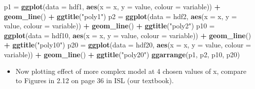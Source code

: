 \documentclass[]{article}
\newenvironment{Shaded}{\begin{snugshade}}{\end{snugshade}}
\newcommand{\DataTypeTok}[1]{\textcolor[rgb]{0.13,0.29,0.53}{#1}}
\newcommand{\KeywordTok}[1]{\textcolor[rgb]{0.13,0.29,0.53}{\textbf{#1}}}
\newcommand{\NormalTok}[1]{#1}
\newcommand{\OperatorTok}[1]{\textcolor[rgb]{0.81,0.36,0.00}{\textbf{#1}}}
\newcommand{\StringTok}[1]{\textcolor[rgb]{0.31,0.60,0.02}{#1}}
\providecommand{\tightlist}{%
  \setlength{\itemsep}{0pt}\setlength{\parskip}{0pt}}
\begin{document}
\begin{Shaded}
\begin{Highlighting}[]
\NormalTok{p1 =}\StringTok{ }\KeywordTok{ggplot}\NormalTok{(}\DataTypeTok{data =}\NormalTok{ hdf1, }\KeywordTok{aes}\NormalTok{(}\DataTypeTok{x =}\NormalTok{ x, }\DataTypeTok{y =}\NormalTok{ value, }\DataTypeTok{colour =}\NormalTok{ variable)) }\OperatorTok{+}\StringTok{ }
\StringTok{    }\KeywordTok{geom_line}\NormalTok{() }\OperatorTok{+}\StringTok{ }\KeywordTok{ggtitle}\NormalTok{(}\StringTok{"poly1"}\NormalTok{)}
\NormalTok{p2 =}\StringTok{ }\KeywordTok{ggplot}\NormalTok{(}\DataTypeTok{data =}\NormalTok{ hdf2, }\KeywordTok{aes}\NormalTok{(}\DataTypeTok{x =}\NormalTok{ x, }\DataTypeTok{y =}\NormalTok{ value, }\DataTypeTok{colour =}\NormalTok{ variable)) }\OperatorTok{+}\StringTok{ }
\StringTok{    }\KeywordTok{geom_line}\NormalTok{() }\OperatorTok{+}\StringTok{ }\KeywordTok{ggtitle}\NormalTok{(}\StringTok{"poly2"}\NormalTok{)}
\NormalTok{p10 =}\StringTok{ }\KeywordTok{ggplot}\NormalTok{(}\DataTypeTok{data =}\NormalTok{ hdf10, }\KeywordTok{aes}\NormalTok{(}\DataTypeTok{x =}\NormalTok{ x, }\DataTypeTok{y =}\NormalTok{ value, }\DataTypeTok{colour =}\NormalTok{ variable)) }\OperatorTok{+}\StringTok{ }
\StringTok{    }\KeywordTok{geom_line}\NormalTok{() }\OperatorTok{+}\StringTok{ }\KeywordTok{ggtitle}\NormalTok{(}\StringTok{"poly10"}\NormalTok{)}
\NormalTok{p20 =}\StringTok{ }\KeywordTok{ggplot}\NormalTok{(}\DataTypeTok{data =}\NormalTok{ hdf20, }\KeywordTok{aes}\NormalTok{(}\DataTypeTok{x =}\NormalTok{ x, }\DataTypeTok{y =}\NormalTok{ value, }\DataTypeTok{colour =}\NormalTok{ variable)) }\OperatorTok{+}\StringTok{ }
\StringTok{    }\KeywordTok{geom_line}\NormalTok{() }\OperatorTok{+}\StringTok{ }\KeywordTok{ggtitle}\NormalTok{(}\StringTok{"poly20"}\NormalTok{)}
\KeywordTok{ggarrange}\NormalTok{(p1, p2, p10, p20)}
\end{Highlighting}
\end{Shaded}

\begin{itemize}
\tightlist
\item
  Now plotting effect of more complex model at 4 chosen values of x,
  compare to Figures in 2.12 on page 36 in ISL (our textbook).
\end{itemize}
\end{document}
